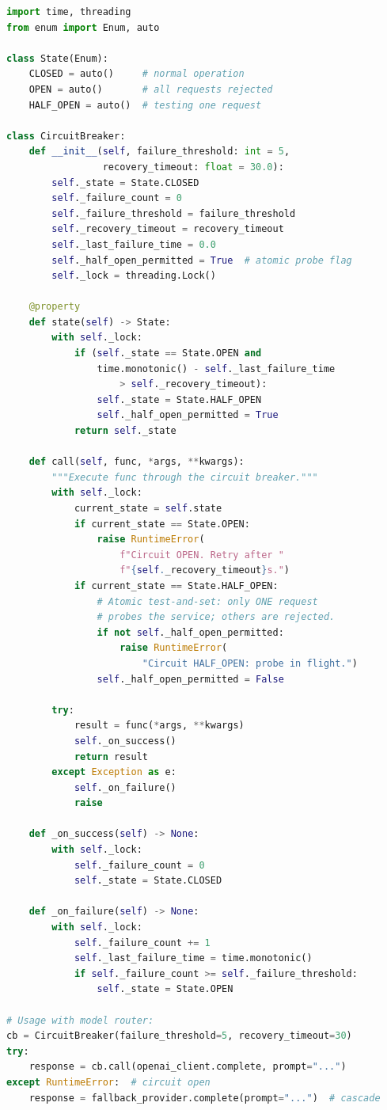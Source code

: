 \begin{lstlisting}[language=Python]
import time, threading
from enum import Enum, auto

class State(Enum):
    CLOSED = auto()     # normal operation
    OPEN = auto()       # all requests rejected
    HALF_OPEN = auto()  # testing one request

class CircuitBreaker:
    def __init__(self, failure_threshold: int = 5,
                 recovery_timeout: float = 30.0):
        self._state = State.CLOSED
        self._failure_count = 0
        self._failure_threshold = failure_threshold
        self._recovery_timeout = recovery_timeout
        self._last_failure_time = 0.0
        self._half_open_permitted = True  # atomic probe flag
        self._lock = threading.Lock()

    @property
    def state(self) -> State:
        with self._lock:
            if (self._state == State.OPEN and
                time.monotonic() - self._last_failure_time
                    > self._recovery_timeout):
                self._state = State.HALF_OPEN
                self._half_open_permitted = True
            return self._state

    def call(self, func, *args, **kwargs):
        """Execute func through the circuit breaker."""
        with self._lock:
            current_state = self.state
            if current_state == State.OPEN:
                raise RuntimeError(
                    f"Circuit OPEN. Retry after "
                    f"{self._recovery_timeout}s.")
            if current_state == State.HALF_OPEN:
                # Atomic test-and-set: only ONE request
                # probes the service; others are rejected.
                if not self._half_open_permitted:
                    raise RuntimeError(
                        "Circuit HALF_OPEN: probe in flight.")
                self._half_open_permitted = False

        try:
            result = func(*args, **kwargs)
            self._on_success()
            return result
        except Exception as e:
            self._on_failure()
            raise

    def _on_success(self) -> None:
        with self._lock:
            self._failure_count = 0
            self._state = State.CLOSED

    def _on_failure(self) -> None:
        with self._lock:
            self._failure_count += 1
            self._last_failure_time = time.monotonic()
            if self._failure_count >= self._failure_threshold:
                self._state = State.OPEN

# Usage with model router:
cb = CircuitBreaker(failure_threshold=5, recovery_timeout=30)
try:
    response = cb.call(openai_client.complete, prompt="...")
except RuntimeError:  # circuit open
    response = fallback_provider.complete(prompt="...")  # cascade
\end{lstlisting}

